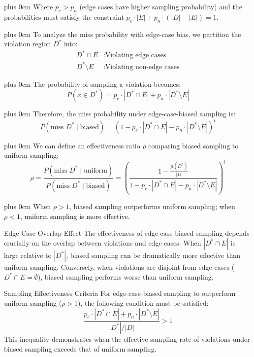 \documentclass[conference]{IEEEtran}
\newcommand{\justifytext}{\leftskip=0pt \rightskip=0pt plus 0cm}
\begin{document}
\justifytext
Where $p_e > p_n$ (edge cases have higher sampling probability) and the probabilities must satisfy the constraint $p_e \cdot |E| + p_n \cdot (|D| - |E|) = 1$.

\justifytext
To analyze the miss probability with edge-case bias, we partition the violation region $D^*$ into:
\begin{align}
D^* \cap E &: \text{Violating edge cases} \\
D^* \setminus E &: \text{Violating non-edge cases}
\end{align}

\justifytext
The probability of sampling a violation becomes:
\begin{equation}
P(x \in D^*) = p_e \cdot |D^* \cap E| + p_n \cdot |D^* \setminus E|
\end{equation}

\justifytext
Therefore, the miss probability under edge-case-biased sampling is:
\begin{equation}
P(\text{miss } D^* \mid \text{biased}) = (1 - p_e \cdot |D^* \cap E| - p_n \cdot |D^* \setminus E|)^t
\end{equation}

\justifytext
We can define an effectiveness ratio $\rho$ comparing biased sampling to uniform sampling:
\begin{equation}
\rho = \frac{P(\text{miss } D^* \mid \text{uniform})}{P(\text{miss } D^* \mid \text{biased})} = \left(\frac{1 - \frac{\mu(D^*)}{|D|}}{1 - p_e \cdot |D^* \cap E| - p_n \cdot |D^* \setminus E|}\right)^t
\end{equation}

\justifytext
When $\rho > 1$, biased sampling outperforms uniform sampling; when $\rho < 1$, uniform sampling is more effective.

\begin{theorembox}{Edge Case Overlap Effect}
The effectiveness of edge-case-biased sampling depends crucially on the overlap between violations and edge cases. When $|D^* \cap E|$ is large relative to $|D^*|$, biased sampling can be dramatically more effective than uniform sampling. Conversely, when violations are disjoint from edge cases ($D^* \cap E = \emptyset$), biased sampling performs worse than uniform sampling.
\end{theorembox}

\begin{theorembox}{Sampling Effectiveness Criteria}
For edge-case-biased sampling to outperform uniform sampling ($\rho > 1$), the following condition must be satisfied:
\begin{equation}
\frac{p_e \cdot |D^* \cap E| + p_n \cdot |D^* \setminus E|}{|D^*|/|D|} > 1
\end{equation}
This inequality demonstrates when the effective sampling rate of violations under biased sampling exceeds that of uniform sampling.
\end{theorembox}
\end{document}
